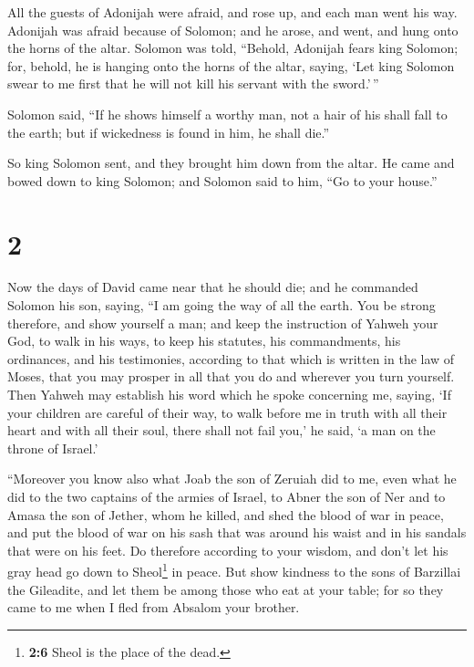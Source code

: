  All the guests of Adonijah were afraid, and rose up, and
each man went his way.  Adonijah was afraid because of
Solomon; and he arose, and went, and hung onto the horns of the altar.
 Solomon was told, ``Behold, Adonijah fears king Solomon;
for, behold, he is hanging onto the horns of the altar, saying, `Let
king Solomon swear to me first that he will not kill his servant with
the sword.'\,''

 Solomon said, ``If he shows himself a worthy man, not a
hair of his shall fall to the earth; but if wickedness is found in him,
he shall die.''

 So king Solomon sent, and they brought him down from the
altar. He came and bowed down to king Solomon; and Solomon said to him,
``Go to your house.''

\hypertarget{section-1}{%
\section{2}\label{section-1}}

 Now the days of David came near that he should die; and
he commanded Solomon his son, saying,  ``I am going the
way of all the earth. You be strong therefore, and show yourself a man;
 and keep the instruction of Yahweh your God, to walk in
his ways, to keep his statutes, his commandments, his ordinances, and
his testimonies, according to that which is written in the law of Moses,
that you may prosper in all that you do and wherever you turn yourself.
 Then Yahweh may establish his word which he spoke
concerning me, saying, `If your children are careful of their way, to
walk before me in truth with all their heart and with all their soul,
there shall not fail you,' he said, `a man on the throne of Israel.'

 ``Moreover you know also what Joab the son of Zeruiah did
to me, even what he did to the two captains of the armies of Israel, to
Abner the son of Ner and to Amasa the son of Jether, whom he killed, and
shed the blood of war in peace, and put the blood of war on his sash
that was around his waist and in his sandals that were on his feet.
 Do therefore according to your wisdom, and don't let his
gray head go down to Sheol\footnote{\textbf{2:6} Sheol is the place of
  the dead.} in peace.  But show kindness to the sons of
Barzillai the Gileadite, and let them be among those who eat at your
table; for so they came to me when I fled from Absalom your brother.

